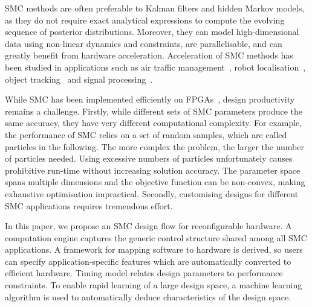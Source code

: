 SMC methods are often preferable to Kalman filters and hidden Markov models, as they do not require exact analytical expressions to compute the evolving sequence of posterior distributions.
Moreover, they can model high-dimensional data using non-linear dynamics and constraints, are parallelisable, and can greatly benefit from hardware acceleration.
Acceleration of SMC methods has been studied in applications such as air traffic management~\cite{chau13b,eele13}, robot localisation~\cite{chau13a}, object tracking~\cite{happe13} and signal processing~\cite{hendeby07}.

While SMC has been implemented efficiently on FPGAs~\cite{chau13a,chau13b,happe13,hendeby07}, design productivity remains a challenge.
Firstly, while different sets of SMC parameters produce the same accuracy, they have very different computational complexity.
For example, the performance of SMC relies on a set of random samples, which are called particles in the following.
The more complex the problem, the larger the number of particles needed.
Using excessive numbers of particles unfortunately causes prohibitive run-time without increasing solution accuracy.
The parameter space spans multiple dimensions and the objective function can be non-convex, making exhaustive optimisation impractical.
Secondly, customising designs for different SMC applications requires tremendous effort.

In this paper, we propose an SMC design flow for reconfigurable hardware.
A computation engine captures the generic control structure shared among all SMC applications.
A framework for mapping software to hardware is derived, so users can specify application-specific features which are automatically converted to efficient hardware. 
Timing model relates design parameters to performance constraints.
To enable rapid learning of a large design space, a machine learning algorithm is used to automatically deduce characteristics of the design space.

